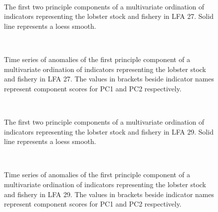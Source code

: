 \documentclass[11pt]{article}
\newcommand{\D}{.}
\newcommand{\e}{/backup/bio_data/bio.lobster/figures/} %
\begin{document}


\begin{figure}
\centering
   \\
                     \caption{The first two principle components of a multivariate ordination of indicators representing the lobster stock and fishery in LFA 27. Solid line represents a loess smooth.}
\end{figure}
\clearpage

\begin{figure}

   \\
                     \caption{Time series of anomalies of the first principle component of a multivariate ordination of indicators representing the lobster stock and fishery in LFA 27. The values in brackets beside indicator names represent component scores for PC1 and PC2 respectively.}
\end{figure}


\begin{figure}
\centering
   \\
                     \caption{The first two principle components of a multivariate ordination of indicators representing the lobster stock and fishery in LFA 29. Solid line represents a loess smooth.}
\end{figure}
\clearpage

\begin{figure}

   \\
                     \caption{Time series of anomalies of the first principle component of a multivariate ordination of indicators representing the lobster stock and fishery in LFA 29. The values in brackets beside indicator names represent component scores for PC1 and PC2 respectively.}
\end{figure}
\end{document}
